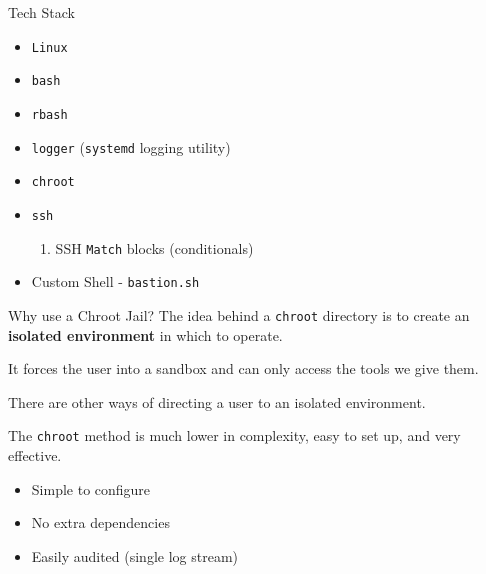 \documentclass[14pt,compress,dvipsnames,aspectratio=169]{beamer} %
\begin{document}
\begin{frame}{Tech Stack}
    \begin{itemize}
        \item{\texttt{Linux}}
        \item{\texttt{bash}}
        \item{\texttt{rbash}}
        \item{\texttt{logger} (\texttt{systemd} logging utility)}
        \item{\texttt{chroot}}
        \item{\texttt{ssh}}
            \begin{enumerate}
                \item{SSH \texttt{Match} blocks (conditionals)}
            \end{enumerate}
        \item{Custom Shell - \texttt{bastion.sh}}
    \end{itemize}
\end{frame}


\begin{frame}{Why use a Chroot Jail?}
    The idea behind a \texttt{chroot} directory is to create an \textbf{isolated
    environment} in which to operate.   

    It forces the user into a sandbox and can only access the tools we give them.  

    There are other ways of directing a user to an isolated environment.  

    The \texttt{chroot} method is much lower in complexity, easy to set up, and very effective.  
    \begin{itemize}
        \item Simple to configure
        \item No extra dependencies
        \item Easily audited (single log stream)
    \end{itemize}
\end{frame}
\end{document}
